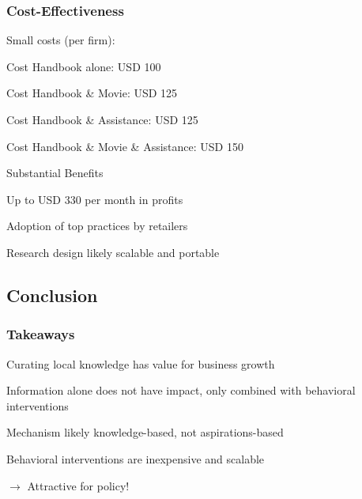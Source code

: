 \documentclass[hideothersubsections, usenames,dvipsnames,10pt]{beamer}
\newenvironment{itemize_3pt}{\itemize\addtolength{\itemsep}{3pt}}{\enditemize}
\begin{document}
\begin{frame}
\frametitle{Cost-Effectiveness}

\textcolor{bdf}{Small costs (per firm)}:
\begin{itemize_3pt}
\item Cost Handbook alone: USD 100
\item Cost Handbook \& Movie: USD 125
\item Cost Handbook \& Assistance: USD 125
\item Cost Handbook \& Movie \& Assistance: USD 150
\end{itemize_3pt}
\vspace{0.5em}

\textcolor{bdf}{Substantial Benefits}
\begin{itemize_3pt}
\item Up to USD 330 per month in profits
\item Adoption of top practices by retailers
\end{itemize_3pt}

\vspace{0.5em}
Research design likely \textcolor{bdf}{scalable and portable}

\end{frame}

\subsection{Conclusion}
\begin{frame}
\frametitle{Takeaways}
\begin{itemize_3pt}
    \item \textcolor{bdf}{Curating local knowledge has value for business growth} 
    \item Information alone does not have impact, only combined with \textcolor{bdf}{behavioral interventions}
    \item Mechanism likely \textcolor{bdf}{knowledge-based}, not aspirations-based
	\item Behavioral interventions are \textcolor{bdf}{inexpensive and scalable}
	\vspace{-0.5em}
	\item[] $\rightarrow$  Attractive for policy!
    
\end{itemize_3pt}
\end{frame}


%
%
\end{document}
